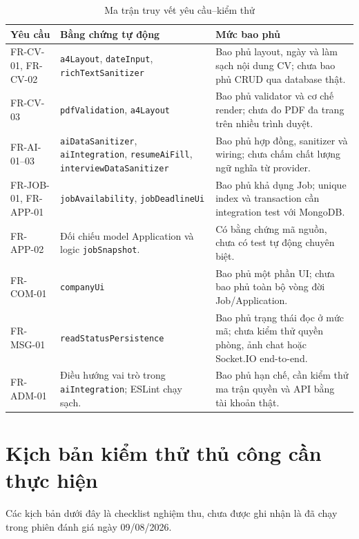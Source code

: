 \begin{table}[H]
    \centering
    \footnotesize
    \begin{tabularx}{\textwidth}{|p{}|p{}|Y|} \hline
        \textbf{Yêu cầu} & \textbf{Bằng chứng tự động} & \textbf{Mức bao phủ} \\ \hline
        FR-CV-01, FR-CV-02 & \texttt{a4Layout}, \texttt{dateInput}, \texttt{richTextSanitizer} & Bao phủ layout, ngày và làm sạch nội dung CV; chưa bao phủ CRUD qua database thật. \\ \hline
        FR-CV-03 & \texttt{pdfValidation}, \texttt{a4Layout} & Bao phủ validator và cơ chế render; chưa đo PDF đa trang trên nhiều trình duyệt. \\ \hline
        FR-AI-01--03 & \texttt{aiDataSanitizer}, \texttt{aiIntegration}, \texttt{resumeAiFill}, \texttt{interviewDataSanitizer} & Bao phủ hợp đồng, sanitizer và wiring; chưa chấm chất lượng ngữ nghĩa từ provider. \\ \hline
        FR-JOB-01, FR-APP-01 & \texttt{jobAvailability}, \texttt{jobDeadlineUi} & Bao phủ khả dụng Job; unique index và transaction cần integration test với MongoDB. \\ \hline
        FR-APP-02 & Đối chiếu model Application và logic \texttt{jobSnapshot}. & Có bằng chứng mã nguồn, chưa có test tự động chuyên biệt. \\ \hline
        FR-COM-01 & \texttt{companyUi} & Bao phủ một phần UI; chưa bao phủ toàn bộ vòng đời Job/Application. \\ \hline
        FR-MSG-01 & \texttt{readStatusPersistence} & Bao phủ trạng thái đọc ở mức mã; chưa kiểm thử quyền phòng, ảnh chat hoặc Socket.IO end-to-end. \\ \hline
        FR-ADM-01 & Điều hướng vai trò trong \texttt{aiIntegration}; ESLint chạy sạch. & Bao phủ hạn chế, cần kiểm thử ma trận quyền và API bằng tài khoản thật. \\ \hline
    \end{tabularx}
    \caption{Ma trận truy vết yêu cầu--kiểm thử}
    \label{tab:requirements-tests}
\end{table}

\clearpage
\section{Kịch bản kiểm thử thủ công cần thực hiện}

Các kịch bản dưới đây là checklist nghiệm thu, chưa được ghi nhận là đã chạy trong phiên đánh giá ngày 09/08/2026.


